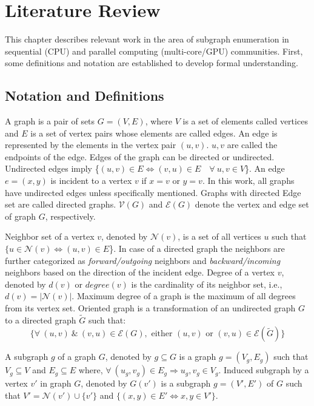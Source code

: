 \chapter{Literature Review}\label{chap:lit}

This chapter describes relevant work in the area of subgraph enumeration in sequential (CPU) and parallel computing (multi-core/GPU) communities.
First, some definitions and notation are established to develop formal understanding.

\section{Notation and Definitions}
A graph is a pair of sets $G=(V,E)$, where $V$ is a set of elements called vertices and $E$ is a set of vertex pairs whose elements are called edges.
An edge is represented by the elements in the vertex pair $(u,v)$.
$u, v$ are called the endpoints of the edge.
Edges of the graph can be directed or undirected.
Undirected edges imply \{$(u,v)\in E \Leftrightarrow (v,u) \in E \quad \forall ~ u, v \in V$\}.
An edge $e = (x,y)$ is incident to a vertex $v$ if $x=v$ or $y=v$.
In this work, all graphs have undirected edges unless specifically mentioned.
Graphs with directed Edge set are called directed graphs.
$\mathcal{V}(G)$  and $\mathcal{E}(G)$ denote the vertex and edge set of graph $G$, respectively.

Neighbor set of a vertex $v$, denoted by $\mathcal{N}(v)$, is a set of all vertices $u$ such that $\{u \in \mathcal{N}(v) \Leftrightarrow (u,v) \in E$\}.
In case of a directed graph the neighbors are further categorized as \textit{forward/outgoing} neighbors and \textit{backward/incoming} neighbors based on the direction of the incident edge.
Degree of a vertex $v$, denoted by $d(v)$ or $degree(v)$ is the cardinality of its neighbor set, i.e., $d(v)=|\mathcal{N}(v)|$.
Maximum degree of a graph is the maximum of all degrees from its vertex set.
Oriented graph is a transformation of an undirected graph $G$ to a directed graph $\tilde{G}$ such that: $$\{\forall~ (u,v) ~\& ~ (v,u) \in \mathcal{E}(G), \text{ either } (u,v) \text{ or } (v,u) \in \mathcal{E}(\tilde{G})\}$$


A subgraph $g$ of a graph $G$, denoted by $g \subseteq G$ is a graph $g=(V_g, E_g)$ such that $V_g \subseteq V$ and $E_g \subseteq E$ where, $\forall~ (u_g, v_g) \in E_g \Rightarrow u_g, v_g \in V_g$.
Induced subgraph by a vertex $v'$ in graph $G$, denoted by $G(v')$ is a subgraph $g=(V', E')$ of $G$ such that $V'=\mathcal{N}(v')\cup \{v'\}$ and $\{(x,y) \in E'\Leftrightarrow {x,y} \in V'\}$.

